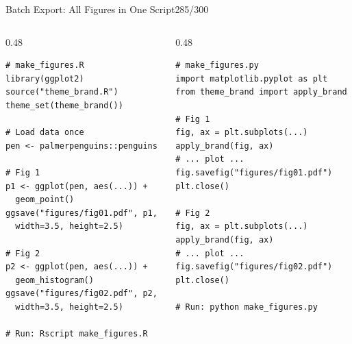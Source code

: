 \documentclass[10pt]{beamer}
\newcommand{\smark}[1]{\hfill{\scriptsize\color{codegray}#1}}
\begin{document}
\begin{frame}[fragile]{Batch Export: All Figures in One Script}\smark{285/300}
\begin{columns}[T]
\begin{column}{0.48\textwidth}
\begin{lstlisting}[style=Rstyle]
# make_figures.R
library(ggplot2)
source("theme_brand.R")
theme_set(theme_brand())

# Load data once
pen <- palmerpenguins::penguins

# Fig 1
p1 <- ggplot(pen, aes(...)) +
  geom_point()
ggsave("figures/fig01.pdf", p1,
  width=3.5, height=2.5)

# Fig 2
p2 <- ggplot(pen, aes(...)) +
  geom_histogram()
ggsave("figures/fig02.pdf", p2,
  width=3.5, height=2.5)

# Run: Rscript make_figures.R
\end{lstlisting}
\end{column}
\begin{column}{0.48\textwidth}
\begin{lstlisting}[style=Pystyle]
# make_figures.py
import matplotlib.pyplot as plt
from theme_brand import apply_brand

# Fig 1
fig, ax = plt.subplots(...)
apply_brand(fig, ax)
# ... plot ...
fig.savefig("figures/fig01.pdf")
plt.close()

# Fig 2
fig, ax = plt.subplots(...)
apply_brand(fig, ax)
# ... plot ...
fig.savefig("figures/fig02.pdf")
plt.close()

# Run: python make_figures.py
\end{lstlisting}
\end{column}
\end{columns}
\end{frame}
\end{document}
